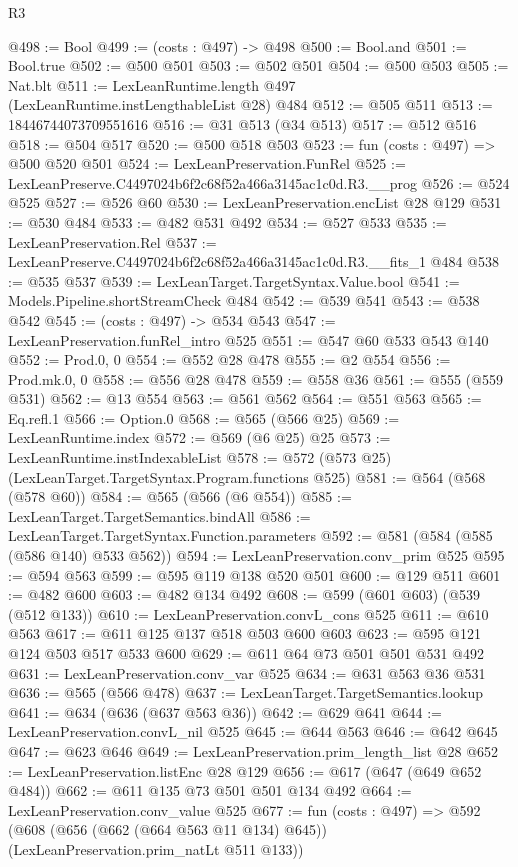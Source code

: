 \begin{lexlean}{R3}
\begin{coremodule}
@498 := Bool
@499 := (costs : @497) -> @498
@500 := Bool.and
@501 := Bool.true
@502 := @500 @501
@503 := @502 @501
@504 := @500 @503
@505 := Nat.blt
@511 := LexLeanRuntime.length @497 (LexLeanRuntime.instLengthableList @28) @484
@512 := @505 @511
@513 := 18446744073709551616
@516 := @31 @513 (@34 @513)
@517 := @512 @516
@518 := @504 @517
@520 := @500 @518 @503
@523 := fun (costs : @497) => @500 @520 @501
@524 := LexLeanPreservation.FunRel
@525 := LexLeanPreserve.C4497024b6f2c68f52a466a3145ac1c0d.R3.__prog
@526 := @524 @525
@527 := @526 @60
@530 := LexLeanPreservation.encList @28 @129
@531 := @530 @484
@533 := @482 @531 @492
@534 := @527 @533
@535 := LexLeanPreservation.Rel
@537 := LexLeanPreserve.C4497024b6f2c68f52a466a3145ac1c0d.R3.__fits_1 @484
@538 := @535 @537
@539 := LexLeanTarget.TargetSyntax.Value.bool
@541 := Models.Pipeline.shortStreamCheck @484
@542 := @539 @541
@543 := @538 @542
@545 := (costs : @497) -> @534 @543
@547 := LexLeanPreservation.funRel_intro @525
@551 := @547 @60 @533 @543 @140
@552 := Prod.{0, 0}
@554 := @552 @28 @478
@555 := @2 @554
@556 := Prod.mk.{0, 0}
@558 := @556 @28 @478
@559 := @558 @36
@561 := @555 (@559 @531)
@562 := @13 @554
@563 := @561 @562
@564 := @551 @563
@565 := Eq.refl.{1}
@566 := Option.{0}
@568 := @565 (@566 @25)
@569 := LexLeanRuntime.index
@572 := @569 (@6 @25) @25
@573 := LexLeanRuntime.instIndexableList
@578 := @572 (@573 @25) (LexLeanTarget.TargetSyntax.Program.functions @525)
@581 := @564 (@568 (@578 @60))
@584 := @565 (@566 (@6 @554))
@585 := LexLeanTarget.TargetSemantics.bindAll
@586 := LexLeanTarget.TargetSyntax.Function.parameters
@592 := @581 (@584 (@585 (@586 @140) @533 @562))
@594 := LexLeanPreservation.conv_prim @525
@595 := @594 @563
@599 := @595 @119 @138 @520 @501
@600 := @129 @511
@601 := @482 @600
@603 := @482 @134 @492
@608 := @599 (@601 @603) (@539 (@512 @133))
@610 := LexLeanPreservation.convL_cons @525
@611 := @610 @563
@617 := @611 @125 @137 @518 @503 @600 @603
@623 := @595 @121 @124 @503 @517 @533 @600
@629 := @611 @64 @73 @501 @501 @531 @492
@631 := LexLeanPreservation.conv_var @525
@634 := @631 @563 @36 @531
@636 := @565 (@566 @478)
@637 := LexLeanTarget.TargetSemantics.lookup
@641 := @634 (@636 (@637 @563 @36))
@642 := @629 @641
@644 := LexLeanPreservation.convL_nil @525
@645 := @644 @563
@646 := @642 @645
@647 := @623 @646
@649 := LexLeanPreservation.prim_length_list @28
@652 := LexLeanPreservation.listEnc @28 @129
@656 := @617 (@647 (@649 @652 @484))
@662 := @611 @135 @73 @501 @501 @134 @492
@664 := LexLeanPreservation.conv_value @525
@677 := fun (costs : @497) =>
  @592 (@608 (@656 (@662 (@664 @563 @11 @134) @645)) (LexLeanPreservation.prim_natLt @511 @133))

\end{coremodule}
\end{lexlean}
